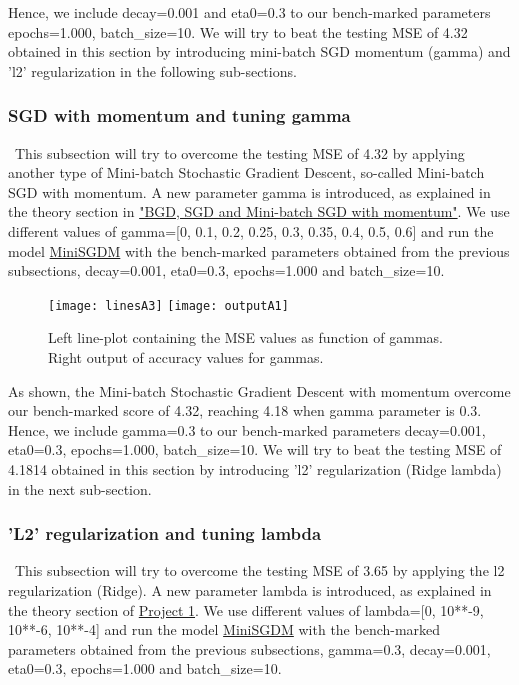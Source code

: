 Hence, we include decay=0.001 and eta0=0.3 to our bench-marked parameters epochs=1.000, batch\_size=10. We will try to beat the testing MSE of 4.32 obtained in this section by introducing mini-batch SGD momentum (gamma) and 'l2' regularization in the following sub-sections.

\subsubsection{SGD with momentum and tuning gamma}
\label{chap:SGD with momentum and tuning gamma}

\qquad \, This subsection will try to overcome the testing MSE of 4.32 by applying another type of Mini-batch Stochastic Gradient Descent, so-called Mini-batch SGD with momentum. A new parameter gamma is introduced, as explained in the theory section in \hyperref[chap:BGD, SGD and Mini-batch SGD with momentum]{"BGD, SGD and Mini-batch SGD with momentum"}. We use different values of gamma=[0, 0.1, 0.2, 0.25, 0.3, 0.35, 0.4, 0.5, 0.6] and run the model \href{https://github.com/fabiorodp/UiO-FYS-STK4155/blob/master/Project2/package/gradient_descent.py}{MiniSGDM} with the bench-marked parameters obtained from the previous subsections, decay=0.001, eta0=0.3, epochs=1.000 and batch\_size=10.

\begin{figure}[H]
\label{fig:figA8}
\centering
\texttt{[image: linesA3]}
\texttt{[image: outputA1]}
\caption{Left line-plot containing the MSE values as function of gammas. Right output of accuracy values for gammas.}
\end{figure}

As shown, the Mini-batch Stochastic Gradient Descent with momentum overcome our bench-marked score of 4.32, reaching 4.18 when gamma parameter is 0.3.\\

Hence, we include gamma=0.3 to our bench-marked parameters decay=0.001, eta0=0.3, epochs=1.000, batch\_size=10. We will try to beat the testing MSE of 4.1814 obtained in this section by introducing 'l2' regularization (Ridge lambda) in the next sub-section.

\subsubsection{'L2' regularization and tuning lambda}
\label{chap:'L2' regularization and tuning lambda}

\qquad \, This subsection will try to overcome the testing MSE of 3.65 by applying the l2 regularization (Ridge). A new parameter lambda is introduced, as explained in the theory section of \href{https://github.com/fabiorodp/UiO-FYS-STK4155/blob/master/Project1}{Project 1}. We use different values of lambda=[0, 10**-9, 10**-6, 10**-4] and run the model \href{https://github.com/fabiorodp/UiO-FYS-STK4155/blob/master/Project2/package/gradient_descent.py}{MiniSGDM} with the bench-marked parameters obtained from the previous subsections, gamma=0.3, decay=0.001, eta0=0.3, epochs=1.000 and batch\_size=10.

